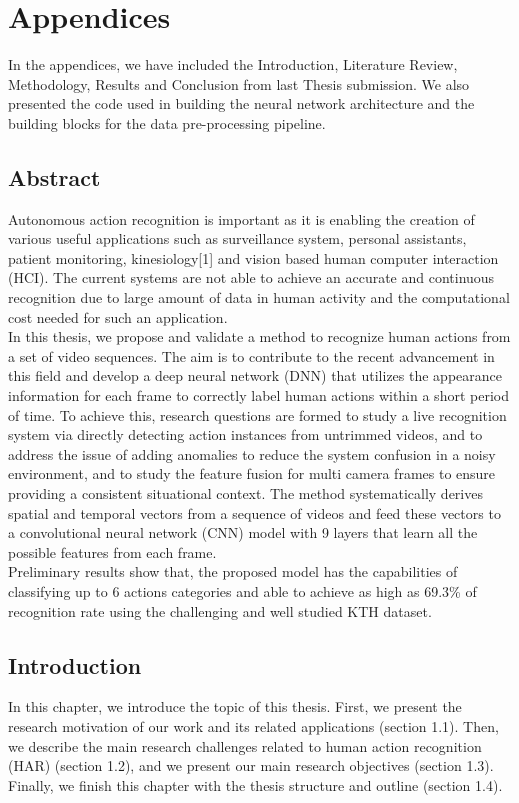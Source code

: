 \chapter{Appendices}
In the appendices, we have included the Introduction, Literature Review, Methodology, Results and Conclusion from last Thesis submission. We also presented the code used in building the neural network architecture and the building blocks for the data pre-processing pipeline.


\section{Abstract}
\hspace{5mm} Autonomous action recognition is important as it is enabling the creation of various useful applications such as surveillance system, personal assistants, patient monitoring, kinesiology[1] and vision based human computer interaction (HCI). The current systems are not able to achieve an accurate and continuous recognition due to large amount of data in human activity and the computational cost needed for such an application.\\

In this thesis, we propose and validate a method to recognize human actions from a set of video sequences. The aim is to contribute to the recent advancement in this field and develop a deep neural network (DNN) that utilizes the appearance information for each frame to correctly label human actions within a short period of time. To achieve this, research questions are formed to study a live recognition system via directly detecting action instances from untrimmed videos, and to address the issue of adding anomalies to reduce the system confusion in a noisy environment, and to study the feature fusion for multi camera frames to ensure providing a consistent situational context. The method systematically derives spatial and temporal vectors from a sequence of videos and feed these vectors to a convolutional neural network (CNN) model with 9 layers that learn all the possible features from each frame.\\

Preliminary results show that, the proposed model has the capabilities of classifying up to 6 actions categories and able to achieve as high as 69.3\% of recognition rate using the challenging and well studied KTH dataset.


\section{Introduction} %
In this chapter, we introduce the topic of this thesis. First, we present the research motivation of our work and its related applications (section 1.1). Then, we describe the main research challenges related to human action recognition (HAR) (section 1.2), and we present our main research objectives (section 1.3). Finally, we finish this chapter with the thesis structure and outline (section 1.4).
\label{Chapter1} %


